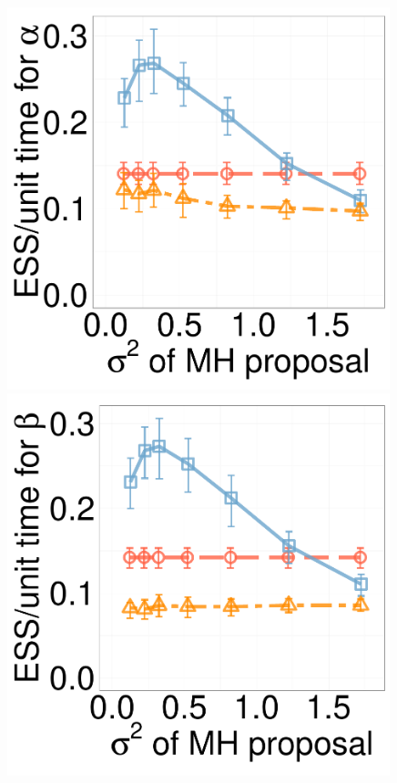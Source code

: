 \begin{figure}[H]
\begin{minipage}[hp]{0.24\linewidth}
	\end{minipage}
  \begin{minipage}[hp]{0.24\linewidth}
  \centering
    \includegraphics [width=0.99\textwidth, angle=0]{figs/new_experiment_figs/cq_alpha_dim10_k2.pdf}
	\end{minipage}
  \begin{minipage}[hp]{0.24\linewidth}
  \centering
    \includegraphics [width=0.99\textwidth, angle=0]{figs/new_experiment_figs/cq_beta_dim10_k2.pdf}

\end{minipage}
\end{figure}
